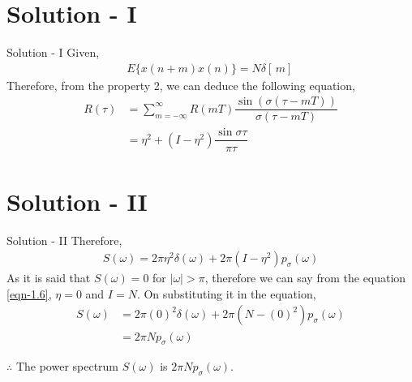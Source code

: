 \documentclass{beamer}
\begin{document}
\section{Solution - I}
\begin{frame}{Solution - I}
Given,
	\begin{align}
	E\{x(n+m)x(n)\}=N\delta[\,m]\,
	\end{align}
	Therefore, from the property 2, we can deduce the following equation,
	\begin{align}
	R(\tau)&=\sum_{m=-\infty}^{\infty}R(mT)\dfrac{\sin(\sigma(\tau-mT))}{\sigma(\tau-mT)}\\
	       &=\eta^{2} + (I-\eta^{2})\dfrac{\sin \sigma\tau}{\pi\tau}
	\end{align}
	\end{frame}
\section{Solution - II}
\begin{frame}{Solution - II}
	Therefore,
	\begin{align}
	S(\omega)=2\pi\eta^{2}\delta(\omega)+2\pi(I-\eta^{2})p_{\sigma}(\omega)\label{eqn-1.6}
	\end{align}
	As it is said that $S(\omega)=0$ for $|\omega|>\pi$, therefore we can say from the equation \ref{eqn-1.6}, $\eta=0$ and $I=N$. On substituting it in the equation,
	\begin{align}
	S(\omega)&=2\pi(0)^{2}\delta(\omega)+2\pi(N-(0)^{2})p_{\sigma}(\omega)\\
	         &=2\pi N p_{\sigma}(\omega)
	\end{align}
	\par$\therefore$ The power spectrum $S(\omega)$ is $2\pi N p_{\sigma}(\omega)$.
\end{frame}
\end{document}
